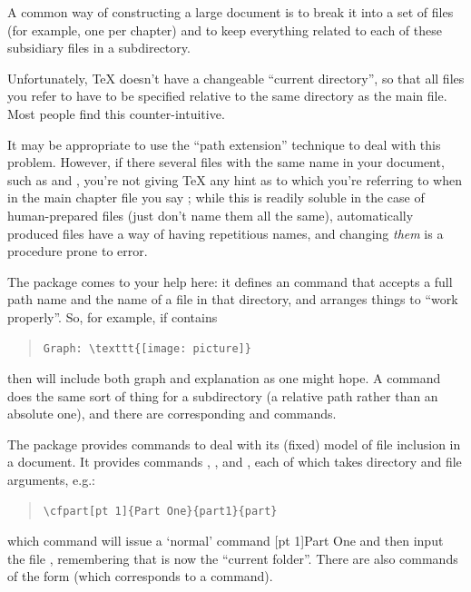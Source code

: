 
A common way of constructing a large document is to break it into a
set of files (for example, one per chapter) and to keep everything
related to each of these subsidiary files in a subdirectory.

Unfortunately, \TeX{} doesn't have a changeable ``current directory'',
so that all files you refer to have to be specified relative to the
same directory as the main file.  Most people find this
counter-intuitive.

It may be appropriate to use the ``path extension'' technique
 to deal with
this problem.  However, if there several files with the same name in
your document, such as  and
, you're not giving \TeX{} any hint as to
which you're referring to when in the main chapter file you say
; while this is readily soluble in the case of
human-prepared files (just don't name them all the same),
automatically produced files have a way of having repetitious names,
and changing \emph{them} is a procedure prone to error.

The  package comes to your help here: it defines an
 command that accepts a full path name and the name of a
file in that directory, and arranges things to ``work properly''.
So, for example, if  contains
\begin{quote}
\begin{verbatim}
Graph: \texttt{[image: picture]}

\end{verbatim}
\end{quote}
then  will include both
graph and explanation as one might hope.  A  command
does the same sort of thing for a subdirectory (a relative path rather
than an absolute one), and there are corresponding 
and  commands.

The  package provides commands to deal with its
(fixed) model of file inclusion in a document.  It provides commands
, ,  and ,
each of which takes directory and file arguments, e.g.:
\begin{quote}
\begin{verbatim}
\cfpart[pt 1]{Part One}{part1}{part}
\end{verbatim}
\end{quote}
which command will issue a `normal' command %
[pt 1]{Part One} and then input the file
, remembering that  is now the
``current folder''.  There are also commands of the form
 (which corresponds to a  command).

